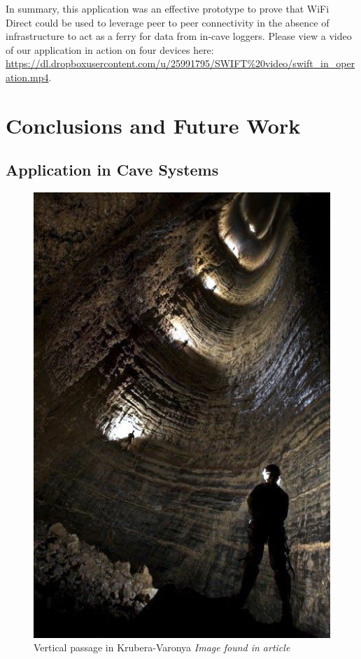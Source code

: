 \documentclass[10pt,twocolumn]{article}
\begin{document}
In summary, this application was an effective prototype to prove that WiFi Direct could be used to leverage peer to peer connectivity in the absence of infrastructure to act as a ferry for data from in-cave loggers.
Please view a video of our application in action on four devices here: \url{https://dl.dropboxusercontent.com/u/25991795/SWIFT%20video/swift_in_operation.mp4}.

\section{Conclusions and Future Work}

\subsection{Application in Cave Systems}
\label{sec:Application in Cave Systems}
\begin{figure}
\includegraphics[width=\columnwidth]{krubera_pit_dark}
\caption{Vertical passage in Krubera-Varonya \textit{Image found in article \cite{krub_blaze}}}
\label{fig:krub_drop}
\end{figure}
\end{document}
